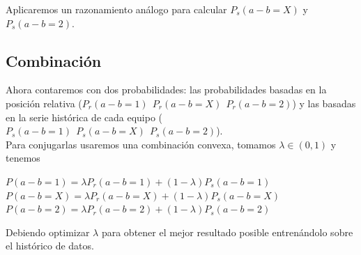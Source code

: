 Aplicaremos un razonamiento análogo para calcular $P_{s}(a-b=X)$ y $P_{s}(a-b=2)$.

\subsection{Combinación}
Ahora contaremos con dos probabilidades: las probabilidades basadas en la posición relativa ($P_{r}(a-b=1) \ \ P_{r}(a-b=X) \ \ P_{r}(a-b=2)$) y las basadas en la serie histórica de cada equipo ($P_{s}(a-b=1) \ \ P_{s}(a-b=X) \ \ P_{s}(a-b=2)$).\\

Para conjugarlas usaremos una combinación convexa, tomamos $\lambda \in (0,1)$ y tenemos
\begin{center}
	$ P(a-b=1) = \lambda P_{r}(a-b=1) + (1-\lambda) P_{s}(a-b=1)$\\
	$ P(a-b=X) = \lambda P_{r}(a-b=X) + (1-\lambda) P_{s}(a-b=X)$\\
	$ P(a-b=2) = \lambda P_{r}(a-b=2) + (1-\lambda) P_{s}(a-b=2)$
\end{center}
Debiendo optimizar $\lambda$ para obtener el mejor resultado posible entrenándolo sobre el histórico de datos.